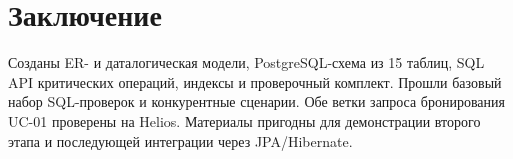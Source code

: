 \documentclass[12pt,a4paper]{article}
\begin{document}
\section{Заключение}

Созданы ER- и даталогическая модели, PostgreSQL-схема из 15 таблиц,
SQL API критических операций, индексы и проверочный комплект.
Прошли базовый набор SQL-проверок и конкурентные сценарии. Обе ветки
запроса бронирования UC-01 проверены на Helios.
Материалы пригодны для демонстрации второго этапа и последующей интеграции
через JPA/Hibernate.
\end{document}
